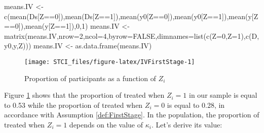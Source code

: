 \documentclass[
]{book}
\newenvironment{Shaded}{\begin{snugshade}}{\end{snugshade}}
\newcommand{\AttributeTok}[1]{\textcolor[rgb]{0.77,0.63,0.00}{#1}}
\newcommand{\ConstantTok}[1]{\textcolor[rgb]{0.00,0.00,0.00}{#1}}
\newcommand{\DecValTok}[1]{\textcolor[rgb]{0.00,0.00,0.81}{#1}}
\newcommand{\FunctionTok}[1]{\textcolor[rgb]{0.00,0.00,0.00}{#1}}
\newcommand{\NormalTok}[1]{#1}
\newcommand{\OtherTok}[1]{\textcolor[rgb]{0.56,0.35,0.01}{#1}}
\newcommand{\SpecialCharTok}[1]{\textcolor[rgb]{0.00,0.00,0.00}{#1}}
\newcommand{\StringTok}[1]{\textcolor[rgb]{0.31,0.60,0.02}{#1}}
\theoremstyle{definition}
\theoremstyle{definition}
\theoremstyle{definition}
\theoremstyle{definition}
\theoremstyle{remark}
\begin{document}
\begin{Shaded}
\begin{Highlighting}[]
\NormalTok{means.IV }\OtherTok{\textless{}{-}} \FunctionTok{c}\NormalTok{(}\FunctionTok{mean}\NormalTok{(Ds[Z}\SpecialCharTok{==}\DecValTok{0}\NormalTok{]),}\FunctionTok{mean}\NormalTok{(Ds[Z}\SpecialCharTok{==}\DecValTok{1}\NormalTok{]),}\FunctionTok{mean}\NormalTok{(y0[Z}\SpecialCharTok{==}\DecValTok{0}\NormalTok{]),}\FunctionTok{mean}\NormalTok{(y0[Z}\SpecialCharTok{==}\DecValTok{1}\NormalTok{]),}\FunctionTok{mean}\NormalTok{(y[Z}\SpecialCharTok{==}\DecValTok{0}\NormalTok{]),}\FunctionTok{mean}\NormalTok{(y[Z}\SpecialCharTok{==}\DecValTok{1}\NormalTok{]),}\DecValTok{0}\NormalTok{,}\DecValTok{1}\NormalTok{)}
\NormalTok{means.IV }\OtherTok{\textless{}{-}} \FunctionTok{matrix}\NormalTok{(means.IV,}\AttributeTok{nrow=}\DecValTok{2}\NormalTok{,}\AttributeTok{ncol=}\DecValTok{4}\NormalTok{,}\AttributeTok{byrow=}\ConstantTok{FALSE}\NormalTok{,}\AttributeTok{dimnames=}\FunctionTok{list}\NormalTok{(}\FunctionTok{c}\NormalTok{(}\StringTok{\textquotesingle{}Z=0\textquotesingle{}}\NormalTok{,}\StringTok{\textquotesingle{}Z=1\textquotesingle{}}\NormalTok{),}\FunctionTok{c}\NormalTok{(}\StringTok{\textquotesingle{}D\textquotesingle{}}\NormalTok{,}\StringTok{\textquotesingle{}y0\textquotesingle{}}\NormalTok{,}\StringTok{\textquotesingle{}y\textquotesingle{}}\NormalTok{,}\StringTok{\textquotesingle{}Z\textquotesingle{}}\NormalTok{)))}
\NormalTok{means.IV }\OtherTok{\textless{}{-}} \FunctionTok{as.data.frame}\NormalTok{(means.IV)}
\end{Highlighting}
\end{Shaded}

\begin{figure}[htbp]

{\centering \texttt{[image: STCI\_files/figure-latex/IVFirstStage-1]} 

}

\caption{Proportion of participants as a function of $Z_i$}\label{fig:IVFirstStage}
\end{figure}

Figure \ref{fig:IVFirstStage} shows that the proportion of treated when \(Z_i=1\) in our sample is equal to 0.53 while the proportion of treated when \(Z_i=0\) is equal to 0.28, in accordance with Assumption \ref{def:FirstStage}.
In the population, the proportion of treated when \(Z_i=1\) depends on the value of \(\kappa_i\).
Let's derive its value:
\end{document}
